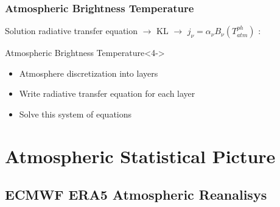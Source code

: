 \documentclass[10pt,aspectratio=169]{beamer}
\begin{document}
\begin{frame}
\frametitle{Atmospheric Brightness Temperature}

Solution radiative transfer equation $\rightarrow$ KL $\rightarrow$ $j_\nu = \alpha_\nu B_\nu(T_{atm}^{ph})$ :



\begin{block}{Atmospheric Brightness Temperature}<4->
%
%
\end{block}

\begin{itemize}
\item<7-> Atmosphere discretization into \alert{layers}
\item<8-> Write radiative transfer equation for each layer 
\item<9-> Solve this system of equations
\end{itemize}

\end{frame}

\section{Atmospheric Statistical Picture}

\subsection{ECMWF ERA5 Atmospheric Reanalisys}
\end{document}
